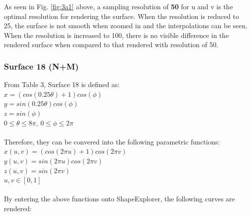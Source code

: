 \documentclass[acmlarge,nonacm=true]{acmart}
\begin{document}
As seen in Fig. \ref{fig:3a1} above, a sampling resolution of \textbf{50} for u and v is the optimal 
resolution for rendering the surface. When the resolution is reduced to 25, the surface is not smooth
when zoomed in and the interpolations can be seen. When the resolution is increased to 100, there is no visible difference 
in the rendered surface when compared to that rendered with resolution of 50.

\newpage
\subsubsection{Surface 18 (N+M)} From Table 3, Surface 18 is defined as:\\
$x = (cos(0.25\theta) + 1)cos(\phi)$\\
$y = sin(0.25\theta)cos(\phi)$\\
$z = sin(\phi)$\\
$0\leq\theta\leq8\pi,\ 0\leq\phi\leq2\pi$\\\\
Therefore, they can be convered into the following parametric functions:\\
$x(u,v) = (cos(2\pi u) + 1)cos(2\pi v)$\\
$y(u,v) = sin(2\pi u)cos(2\pi v)$\\
$z(u,v) = sin(2\pi v)$\\
$u,v\in[0,1]$\\\\
By entering the above functions onto ShapeExplorer, the following curves are rendered:\\
\end{document}
